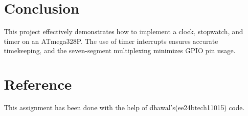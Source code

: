 \documentclass[journal]{IEEEtran}
\numberwithin{equation}{enumi}
\numberwithin{figure}{enumi}
\begin{document}
\section*{Conclusion}
This project effectively demonstrates how to implement a clock, stopwatch, and timer on an ATmega328P. The use of timer interrupts ensures accurate timekeeping, and the seven-segment multiplexing minimizes GPIO pin usage.

\section*{Reference}
This assignment has been done with the help of dhawal's(ee24btech11015) code.
\end{document}
